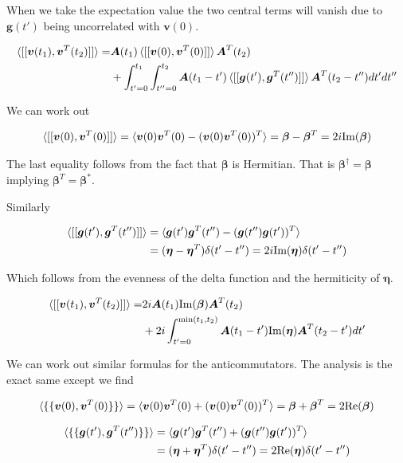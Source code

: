 \documentclass[12pt]{article}
\newcommand{\bv}[1]{\boldsymbol{#1}}
\begin{document}
When we take the expectation value the two central terms will vanish due to $\bv{g}(t')$ being uncorrelated with $\bv{v}(0)$.

\begin{align}
\braket{[[\bv{v}(t_1),\bv{v}^T(t_2)]]} =& \bv{A}(t_1)\braket{[[\bv{v}(0),\bv{v}^T(0)]]}\bv{A}^T(t_2)\\
&+\int_{t'=0}^{t_1}\int_{t''=0}^{t_2} \bv{A}(t_1-t')\braket{[[\bv{g}(t'),\bv{g}^T(t'')]]}\bv{A}^T(t_2-t'') dt' dt'' 
\end{align}

We can work out 

\begin{align}
\braket{[[\bv{v}(0),\bv{v}^T(0)]]} = \braket{\bv{v}(0)\bv{v}^T(0) - (\bv{v}(0)\bv{v}^T(0))^T} = \bv{\beta} - \bv{\beta}^T = 2i \text{Im}(\bv{\beta})
\end{align}

The last equality follows from the fact that $\bv{\beta}$ is Hermitian. That is $\bv{\beta}^{\dag} = \bv{\beta}$ implying $\bv{\beta}^T = \bv{\beta}^*$.

Similarly

\begin{align}
\braket{[[\bv{g}(t'),\bv{g}^T(t'')]]} &= \braket{\bv{g}(t')\bv{g}^T(t'') - (\bv{g}(t'')\bv{g}(t'))^T}\\
&= (\bv{\eta} - \bv{\eta}^T)\delta(t'-t'') = 2i \text{Im}(\bv{\eta}) \delta(t'-t'')
\end{align}

Which follows from the evenness of the delta function and the hermiticity of $\bv{\eta}$.

\begin{align}
\braket{[[\bv{v}(t_1),\bv{v}^T(t_2)]]} =& 2i \bv{A}(t_1) \text{Im}(\bv{\beta}) \bv{A}^T(t_2)\\
&+2i \int_{t'=0}^{\text{min}(t_1,t_2)} \bv{A}(t_1-t')\text{Im}(\bv{\eta})\bv{A}^T(t_2-t') dt'
\end{align}

We can work out similar formulas for the anticommutators. The analysis is the exact same except we find

\begin{align}
\braket{\{\{\bv{v}(0),\bv{v}^T(0)\}\}} = \braket{\bv{v}(0)\bv{v}^T(0) + (\bv{v}(0)\bv{v}^T(0))^T} = \bv{\beta} + \bv{\beta}^T = 2 \text{Re}(\bv{\beta})
\end{align}

\begin{align}
\braket{\{\{\bv{g}(t'),\bv{g}^T(t'')\}\}} &= \braket{\bv{g}(t')\bv{g}^T(t'') + (\bv{g}(t'')\bv{g}(t'))^T}\\
&= (\bv{\eta} + \bv{\eta}^T)\delta(t'-t'') = 2 \text{Re}(\bv{\eta}) \delta(t'-t'')
\end{align}
\end{document}
